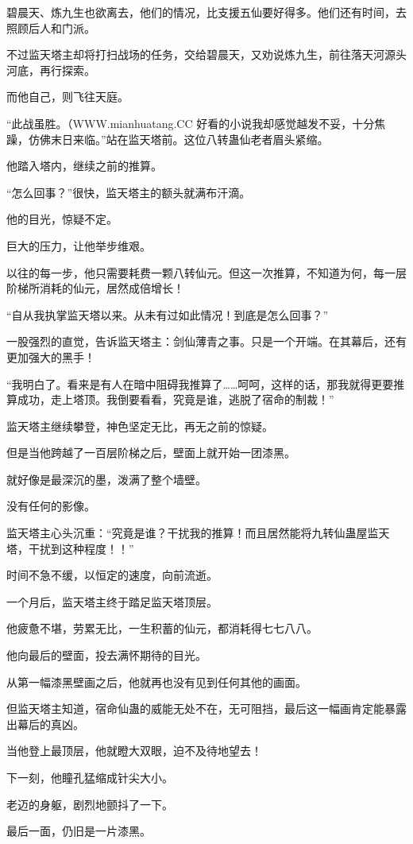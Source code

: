 \begin{this_body}
碧晨天、炼九生也欲离去，他们的情况，比支援五仙要好得多。他们还有时间，去照顾后人和门派。

不过监天塔主却将打扫战场的任务，交给碧晨天，又劝说炼九生，前往落天河源头河底，再行探索。

而他自己，则飞往天庭。

“此战虽胜。（WWW.mianhuatang.CC 好看的小说我却感觉越发不妥，十分焦躁，仿佛末日来临。”站在监天塔前。这位八转蛊仙老者眉头紧缩。

他踏入塔内，继续之前的推算。

“怎么回事？”很快，监天塔主的额头就满布汗滴。

他的目光，惊疑不定。

巨大的压力，让他举步维艰。

以往的每一步，他只需要耗费一颗八转仙元。但这一次推算，不知道为何，每一层阶梯所消耗的仙元，居然成倍增长！

“自从我执掌监天塔以来。从未有过如此情况！到底是怎么回事？”

一股强烈的直觉，告诉监天塔主：剑仙薄青之事。只是一个开端。在其幕后，还有更加强大的黑手！

“我明白了。看来是有人在暗中阻碍我推算了……呵呵，这样的话，那我就得更要推算成功，走上塔顶。我倒要看看，究竟是谁，逃脱了宿命的制裁！”

监天塔主继续攀登，神色坚定无比，再无之前的惊疑。

但是当他跨越了一百层阶梯之后，壁面上就开始一团漆黑。

就好像是最深沉的墨，泼满了整个墙壁。

没有任何的影像。

监天塔主心头沉重：“究竟是谁？干扰我的推算！而且居然能将九转仙蛊屋监天塔，干扰到这种程度！！”

时间不急不缓，以恒定的速度，向前流逝。

一个月后，监天塔主终于踏足监天塔顶层。

他疲惫不堪，劳累无比，一生积蓄的仙元，都消耗得七七八八。

他向最后的壁面，投去满怀期待的目光。

从第一幅漆黑壁画之后，他就再也没有见到任何其他的画面。

但监天塔主知道，宿命仙蛊的威能无处不在，无可阻挡，最后这一幅画肯定能暴露出幕后的真凶。

当他登上最顶层，他就瞪大双眼，迫不及待地望去！

下一刻，他瞳孔猛缩成针尖大小。

老迈的身躯，剧烈地颤抖了一下。

最后一面，仍旧是一片漆黑。


\end{this_body}

